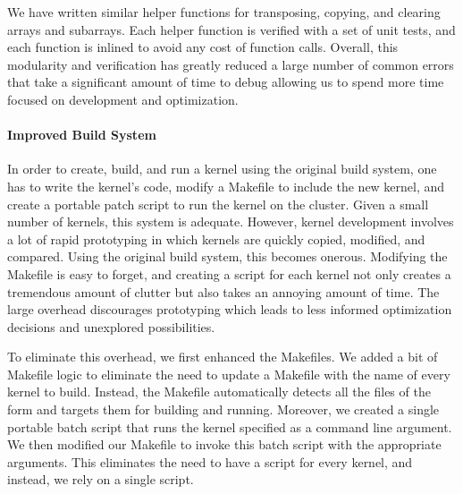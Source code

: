 We have written similar helper functions for transposing, copying, and clearing
arrays and subarrays. Each helper function is verified with a set of unit
tests, and each function is inlined to avoid any cost of function calls.
Overall, this modularity and verification has greatly reduced a large number of
common errors that take a significant amount of time to debug allowing us to
spend more time focused on development and optimization.

\paragraph{Improved Build System}
In order to create, build, and run a kernel using the original  build
system, one has to write the kernel's code, modify a Makefile to include the
new kernel, and create a portable patch script to run the kernel on the
cluster. Given a small number of kernels, this system is adequate. However,
kernel development involves a lot of rapid prototyping in which kernels are
quickly copied, modified, and compared. Using the original build system, this
becomes onerous. Modifying the Makefile is easy to forget, and creating a
script for each kernel not only creates a tremendous amount of clutter but also
takes an annoying amount of time. The large overhead discourages prototyping
which leads to less informed optimization decisions and unexplored possibilities.

To eliminate this overhead, we first enhanced the Makefiles. We added a bit of
Makefile logic to eliminate the need to update a Makefile with the name of
every kernel to build. Instead, the Makefile automatically detects all the
files of the form  and targets them for building and
running. Moreover, we created a single portable batch script that runs the
kernel specified as a command line argument. We then modified our Makefile to
invoke this batch script with the appropriate arguments. This eliminates the
need to have a script for every kernel, and instead, we rely on a single
script.
